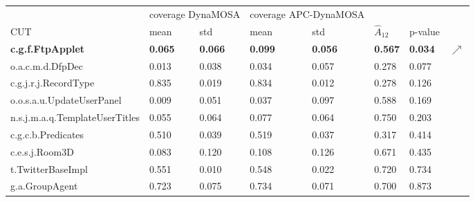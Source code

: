 \begin{tabular}{llllllll}
\hline
\multicolumn{1}{l|}{}                               & \multicolumn{2}{l|}{coverage DynaMOSA} & \multicolumn{2}{l|}{coverage APC-DynaMOSA} &                                  &         \\
\multicolumn{1}{l|}{CUT}                            & mean    & \multicolumn{1}{l|}{std}     & mean    & \multicolumn{1}{l|}{std}    & $\hat{A}_{12}$ & p-value & \\ \hline
\multicolumn{1}{l|}{\textbf{c.g.f.FtpApplet}}       & \textbf{0.065} & \multicolumn{1}{l|}{\textbf{0.066}} & \textbf{0.099} & \multicolumn{1}{l|}{\textbf{0.056}} & \textbf{0.567}                   & \textbf{0.034} & $\nearrow$\\
\multicolumn{1}{l|}{o.a.c.m.d.DfpDec}               & 0.013   & \multicolumn{1}{l|}{0.038}   & 0.034   & \multicolumn{1}{l|}{0.057}  & 0.278                            & 0.077  &  \\
\multicolumn{1}{l|}{c.g.j.r.j.RecordType}           & 0.835   & \multicolumn{1}{l|}{0.019}   & 0.834   & \multicolumn{1}{l|}{0.012}  & 0.278                            & 0.126  &  \\
\multicolumn{1}{l|}{o.o.s.a.u.UpdateUserPanel}      & 0.009   & \multicolumn{1}{l|}{0.051}   & 0.037   & \multicolumn{1}{l|}{0.097}  & 0.588                            & 0.169  &  \\
\multicolumn{1}{l|}{n.s.j.m.a.q.TemplateUserTitles} & 0.055   & \multicolumn{1}{l|}{0.064}   & 0.077   & \multicolumn{1}{l|}{0.064}  & 0.750                            & 0.203  &  \\
\multicolumn{1}{l|}{c.g.c.b.Predicates}             & 0.510   & \multicolumn{1}{l|}{0.039}   & 0.519   & \multicolumn{1}{l|}{0.037}  & 0.317                            & 0.414  &  \\
\multicolumn{1}{l|}{c.e.s.j.Room3D}                 & 0.083   & \multicolumn{1}{l|}{0.120}   & 0.108   & \multicolumn{1}{l|}{0.126}  & 0.671                            & 0.435  &  \\
\multicolumn{1}{l|}{t.TwitterBaseImpl}              & 0.551   & \multicolumn{1}{l|}{0.010}   & 0.548   & \multicolumn{1}{l|}{0.022}  & 0.720                            & 0.734  &  \\
\multicolumn{1}{l|}{g.a.GroupAgent}                 & 0.723   & \multicolumn{1}{l|}{0.075}   & 0.734   & \multicolumn{1}{l|}{0.071}  & 0.700                            & 0.873  &  \\
\end{tabular}